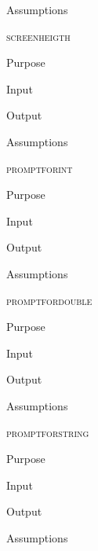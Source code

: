 \documentclass[pdftex, 11pt]{article}
\begin{document}
\begin{description}
\begin{description}
			\item{Assumptions}


		\end{description}


	\item{\textsc{screenheigth}}
		\begin{description}
			\item{Purpose}


			\item{Input}


			\item{Output}


			\item{Assumptions}


		\end{description}


	\item{\textsc{promptforint}}
		\begin{description}
			\item{Purpose}


			\item{Input}


			\item{Output}


			\item{Assumptions}


		\end{description}


	\item{\textsc{promptfordouble}}
		\begin{description}
			\item{Purpose}


			\item{Input}


			\item{Output}


			\item{Assumptions}


		\end{description}


	\item{\textsc{promptforstring}}
		\begin{description}
			\item{Purpose}


			\item{Input}


			\item{Output}


			\item{Assumptions}


		\end{description}


\end{description}
\end{document}
